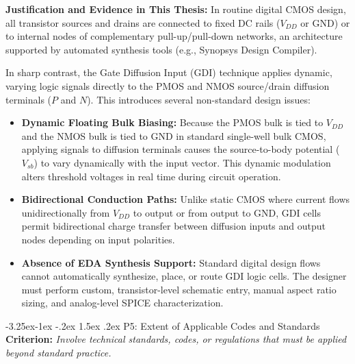 \documentclass[12pt,a4paper,oneside]{report}
\makeatletter
\renewcommand\subsubsection{\@startsection{subsubsection}{3}{\z@}%
                                     {-3.25ex\@plus -1ex \@minus -.2ex}%
                                     {1.5ex \@plus .2ex}%
                                     {\normalfont\normalsize\itshape}}
\makeatother
\begin{document}
\noindent\textbf{Justification and Evidence in This Thesis:}
In routine digital CMOS design, all transistor sources and drains are connected to fixed DC rails ($V_{DD}$ or GND) or to internal nodes of complementary pull-up/pull-down networks, an architecture supported by automated synthesis tools (e.g., Synopsys Design Compiler). 

In sharp contrast, the Gate Diffusion Input (GDI) technique applies dynamic, varying logic signals directly to the PMOS and NMOS source/drain diffusion terminals ($P$ and $N$). This introduces several non-standard design issues:
\begin{itemize}
\item \textbf{Dynamic Floating Bulk Biasing:} Because the PMOS bulk is tied to $V_{DD}$ and the NMOS bulk is tied to GND in standard single-well bulk CMOS, applying signals to diffusion terminals causes the source-to-body potential ($V_{sb}$) to vary dynamically with the input vector. This dynamic modulation alters threshold voltages in real time during circuit operation.
\item \textbf{Bidirectional Conduction Paths:} Unlike static CMOS where current flows unidirectionally from $V_{DD}$ to output or from output to GND, GDI cells permit bidirectional charge transfer between diffusion inputs and output nodes depending on input polarities.
\item \textbf{Absence of EDA Synthesis Support:} Standard digital design flows cannot automatically synthesize, place, or route GDI logic cells. The designer must perform custom, transistor-level schematic entry, manual aspect ratio sizing, and analog-level SPICE characterization.
\end{itemize}

\subsubsection{P5: Extent of Applicable Codes and Standards}
\textbf{Criterion:} \textit{Involve technical standards, codes, or regulations that must be applied beyond standard practice.}
\end{document}
